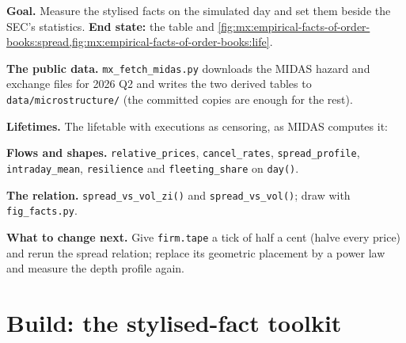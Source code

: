 \begin{tutorial}
\textbf{Goal.} Measure the stylised facts on the simulated day and set them beside the SEC's statistics. \textbf{End state:} the table and
\cref{fig:mx:empirical-facts-of-order-books:spread,fig:mx:empirical-facts-of-order-books:life}.
\begin{tutsteps}
\item \textbf{The public data.} \texttt{mx\_fetch\_midas.py} downloads the MIDAS hazard and exchange files for 2026 Q2 and writes the two derived tables to
\texttt{data/microstructure/} (the committed copies are enough for the rest).
\item \textbf{Lifetimes.} The lifetable with executions as censoring, as MIDAS computes it:
\label{lst:mx:empirical-facts-of-order-books:life}
\item \textbf{Flows and shapes.} \texttt{relative\_prices}, \texttt{cancel\_rates}, \texttt{spread\_profile}, \texttt{intraday\_mean}, \texttt{resilience}
and \texttt{fleeting\_share} on \texttt{day()}.
\item \textbf{The relation.} \texttt{spread\_vs\_vol\_zi()} and \texttt{spread\_vs\_vol()}; draw with \texttt{fig\_facts.py}.
\end{tutsteps}
\textbf{What to change next.} Give \texttt{firm.tape} a tick of half a cent (halve every price) and rerun the spread relation; replace its geometric
placement by a power law and measure the depth profile again.
\end{tutorial}

\section{Build: the stylised-fact toolkit}\label{bld:mx:empirical-facts-of-order-books:lobstats}

